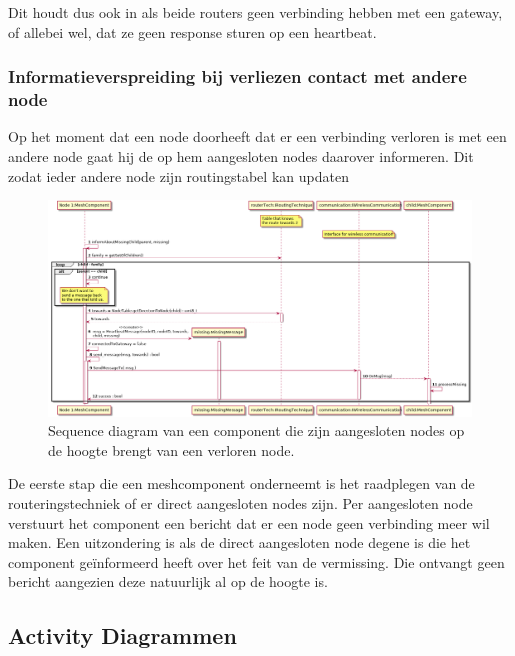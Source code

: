 \documentclass[a4paper, 11pt, oneside]{report}
\begin{document}
Dit houdt dus ook in als beide routers geen verbinding hebben met een gateway, of allebei wel, dat ze geen response sturen op een heartbeat.

\subsubsection{Informatieverspreiding bij verliezen contact met andere node}
\label{DetailedDesign:Communicatie:sequence:contactverlies}
Op het moment dat een node doorheeft dat er een verbinding verloren is met een andere node gaat hij de op hem aangesloten nodes daarover informeren. Dit zodat ieder andere node zijn routingstabel kan updaten 
\begin{figure}[H]
	\begin{center}\includegraphics[width=\linewidth]{UML/out/Communication/Sequence/LostConnectionWithOther/LostConnectionWithOther.png}\end{center}
	\caption{Sequence diagram van een component die zijn aangesloten nodes op de hoogte brengt van een verloren node.}
	\label{fig:communication:sequence:contactverlies}
\end{figure}

De eerste stap die een meshcomponent onderneemt is het raadplegen van de routeringstechniek of er direct aangesloten nodes zijn.
Per aangesloten node verstuurt het component een bericht dat er een node geen verbinding meer wil maken.
Een uitzondering is als de direct aangesloten node degene is die het component geïnformeerd heeft over het feit van de vermissing.
Die ontvangt geen bericht aangezien deze natuurlijk al op de hoogte is.


\subsection{Activity Diagrammen}
\label{DetailedDesign:Communicatie:Activity}
\end{document}
